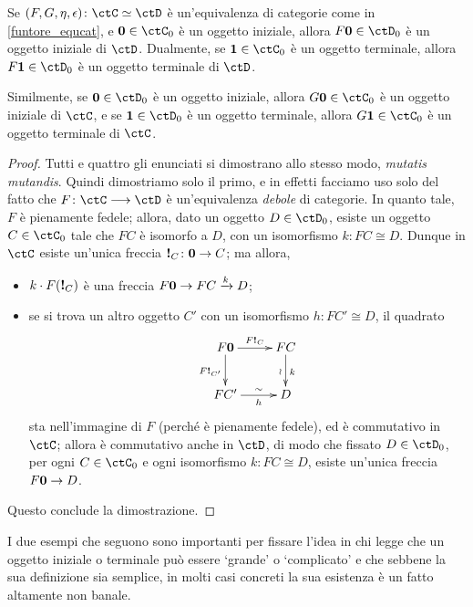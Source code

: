 \begin{lemma}\label{equivs_preservano_init_term}
 Se \((F,G,\eta,\epsilon)\colon\ctC\simeq\ctD\) è un'equivalenza di categorie come in \ref{funtore_equcat}, e \(\init\in\ctC_0\) è un oggetto iniziale, allora \(F\init\in\ctD_0\) è un oggetto iniziale di \(\ctD\). Dualmente, se \(\term\in\ctC_0\) è un oggetto terminale, allora \(F\term\in\ctD_0\) è un oggetto terminale di \(\ctD\).

 Similmente, se \(\init\in\ctD_0\) è un oggetto iniziale, allora \(G\init\in\ctC_0\) è un oggetto iniziale di \(\ctC\), e se \(\term\in\ctD_0\) è un oggetto terminale, allora \(G\term\in\ctC_0\) è un oggetto terminale di \(\ctC\).
\end{lemma}
\begin{proof}
 Tutti e quattro gli enunciati si dimostrano allo stesso modo, \emph{mutatis mutandis}. Quindi dimostriamo solo il primo, e in effetti facciamo uso solo del fatto che \(F \colon \ctC \fun \ctD\) è un'equivalenza \emph{debole} di categorie. In quanto tale, $F$ è pienamente fedele; allora, dato un oggetto \(D\in\ctD_0\), esiste un oggetto \(C\in\ctC_0\) tale che \(FC\) è isomorfo a \(D\), con un isomorfismo \(k \colon FC \cong D\). Dunque in \(\ctC\) esiste un'unica freccia \(\boldsymbol{!}_C \colon \textbf{0} \to C\); ma allora,
 \begin{itemize}
  \item \(k\cdot F(\boldsymbol{!}_C)\) è una freccia \(F\textbf{0} \to FC \xrightarrow{k} D\);
  \item se si trova un altro oggetto \(C'\) con un isomorfismo \(h \colon FC'\cong D\), il quadrato
        \[\xymatrix{
         F\init\ar[r]^-{F\bang_C}\ar[d]_{F\bang_{C'}} & FC \ar[d]^k_\wr \\
         FC' \ar[r]_-h^-\sim & D
         }\]
        sta nell'immagine di \(F\) (perché è pienamente fedele), ed è commutativo in \(\ctC\); allora è commutativo anche in \(\ctD\), di modo che fissato \(D\in\ctD_0\), per ogni \(C\in \ctC_0\) e ogni isomorfismo \(k \colon FC \cong D\), esiste un'unica freccia \(F\textbf{0}\to D\).
 \end{itemize}
 Questo conclude la dimostrazione.
\end{proof}
I due esempi che seguono sono importanti per fissare l'idea in chi legge che un oggetto iniziale o terminale può essere `grande' o `complicato' e che sebbene la sua definizione sia semplice, in molti casi concreti la sua esistenza è un fatto altamente non banale.

